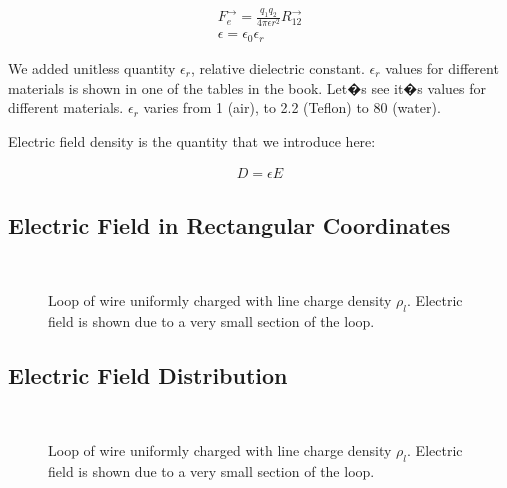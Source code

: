 \begin{eqnarray}
F^{\to}_e=\frac{q_1 q_2}{4 \pi \epsilon r^2} R^{\to}_{12} \\
\epsilon = \epsilon_0 \epsilon_r
\end{eqnarray}\label{Coulombslaw3}

We added unitless quantity $\epsilon_r$, relative dielectric constant. $\epsilon_r$ values for different materials is shown in one of the tables in the book. Let�s see it�s values for different materials. $\epsilon_r$ varies from 1 (air), to 2.2 (Teflon) to 80 (water). 

Electric field density is the quantity that we introduce here:

\begin{eqnarray}
D= \epsilon E
\end{eqnarray}

\subsection{Electric Field in Rectangular Coordinates}


\begin{figure}[htbp]
\begin{center}
\strut{} \\
\end{center}
\caption{Loop of wire uniformly charged with line charge density $\rho_l$. Electric field is shown due to a very small section of the loop.}
\label{wind}
\end{figure}






\subsection{Electric Field Distribution}



\begin{figure}[htbp]
\begin{center}
\strut{} \\
\end{center}
\caption{Loop of wire uniformly charged with line charge density $\rho_l$. Electric field is shown due to a very small section of the loop.}
\label{wind}
\end{figure}





